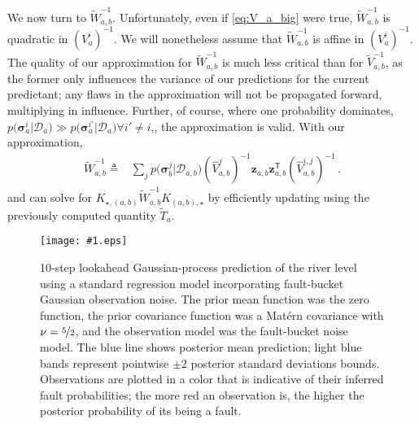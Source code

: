 \documentclass{article}
\newcommand{\psff}[1]{\texttt{[image: \#1.eps]}}
\newcommand{\cm}[1]{\ensuremath{\mathcal{#1}}}
\newcommand{\bm}[1]{\ensuremath{\mathbf{#1}}}
\newcommand{\data}{\ensuremath{\cm{D}}}
\newcommand{\vect}[1]{\bm{#1}}
\newcommand{\vz}{\vect{z}}
\newcommand{\vs}{\vect{\sigma}}
\newcommand{\fPr}{p}
\newcommand{\Prob}[2]{\fPr\bigl(#1\big\vert#2\bigr)}
\newcommand{\tr}{\ensuremath{\mathsf{T}}}
\newcommand{\defequal}{\triangleq}
\begin{document}
We now turn to $\tilde{W}_{a,b}^{-1}$. Unfortunately, even if \eqref{eq:V_a_big} were true, $\tilde{W}_{a,b}^{-1}$ is quadratic in $(V^i_a)^{-1}$. We will nonetheless assume that $\tilde{W}_{a,b}^{-1}$ is affine in $(V^i_a)^{-1}$. The quality of our approximation for $\tilde{W}_{a,b}^{-1}$ is much less critical than for $\tilde{V}^{-1}_{a,b}$, as the former only influences the variance of our predictions for the current predictant; any flaws in the approximation will not be propagated forward, multiplying in influence. Further, of course, where one probability dominates, $\Prob{\vs^i_{a}}{\data_{a}}\gg \Prob{\vs^{i'}_{a}}{\data_{a}} \forall i' \neq i$,, the approximation is valid. With our approximation,
\begin{align}
\tilde{W}^{-1}_{a,b} \defequal
& \sum_{j} \Prob{\vs^j_{b}}{\data_{a,b}} (\hat{V}_{a,b}^{j})^{-1}\vz_{a,b}^{\phantom{\tr}} \vz_{a,b}^\tr (\hat{V}_{a,b}^{i,j})^{-1}\,.\label{eq:Wab}
\end{align}
and can solve for $K_{\star,(a,b)}\tilde{W}^{-1}_{a,b}K_{(a,b),\star}$ by efficiently updating using the previously computed quantity $\tilde{T}_{a}$.




\begin{figure*}
 \begin{centering}
 \psff{faultpredictions}
 \caption{10-step lookahead Gaussian-process prediction of the river
   level using a standard regression model incorporating
   fault-bucket Gaussian observation noise.  The prior mean function
   was the zero function, the prior covariance function was a
   Mat\'{e}rn covariance with $\nu = \nicefrac{5}{2}$, and the
   observation model was the fault-bucket noise model.  The blue
   line shows posterior mean prediction; light blue bands represent
   pointwise $\pm 2$ posterior standard deviations bounds.
   Observations are plotted in a color that is indicative of their
   inferred fault probabilities; the more red an observation is, the
   higher the posterior probability of its being a fault.}
 \end{centering}
 \label{faultpredictions}
\end{figure*}
\end{document}
